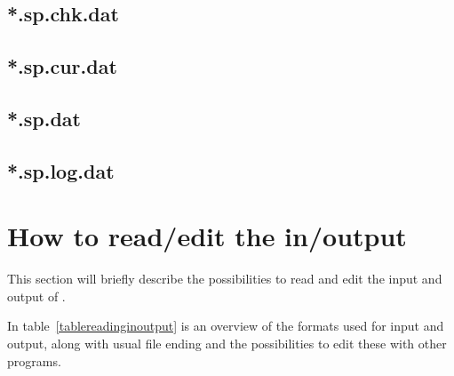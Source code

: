 \subsection{*.sp.chk.dat}

\subsection{*.sp.cur.dat}

\subsection{*.sp.dat}

\subsection{*.sp.log.dat}

\section{How to read/edit the in/output}
This section will briefly describe the possibilities to read and edit
the input and output of \neotwo.

In table~\ref{tablereadinginoutput} is an overview of the formats used
for input and output, along with usual file ending and the possibilities to
edit these with other programs.

